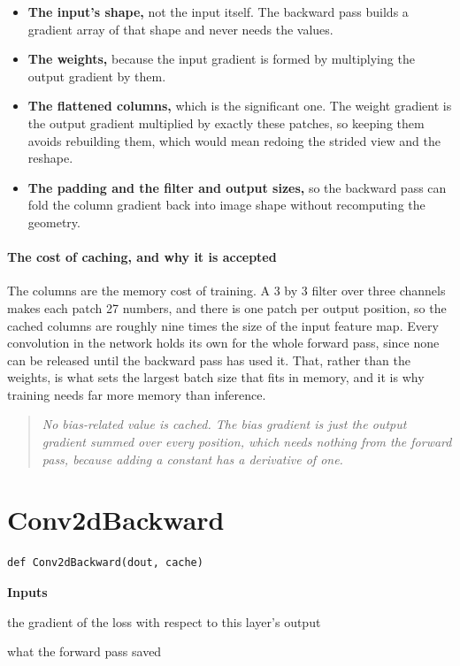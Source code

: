 \begin{itemize}\setlength\itemsep{0pt}
  \item \textbf{The input's shape,} not the input itself. The backward pass builds a gradient array of that shape and never needs the values.
  \item \textbf{The weights,} because the input gradient is formed by multiplying the output gradient by them.
  \item \textbf{The flattened columns,} which is the significant one. The weight gradient is the output gradient multiplied by exactly these patches, so keeping them avoids rebuilding them, which would mean redoing the strided view and the reshape.
  \item \textbf{The padding and the filter and output sizes,} so the backward pass can fold the column gradient back into image shape without recomputing the geometry.
\end{itemize}

\paragraph{The cost of caching, and why it is accepted}
The columns are the memory cost of training. A 3 by 3 filter over three channels makes each patch 27 numbers, and there is one patch per output position, so the cached columns are roughly nine times the size of the input feature map. Every convolution in the network holds its own for the whole forward pass, since none can be released until the backward pass has used it. That, rather than the weights, is what sets the largest batch size that fits in memory, and it is why training needs far more memory than inference.


\begin{quote}\small\itshape No bias-related value is cached. The bias gradient is just the output gradient summed over every position, which needs nothing from the forward pass, because adding a constant has a derivative of one.\end{quote}

\section{Conv2dBackward}
\begin{lstlisting}[style=sig]
def Conv2dBackward(dout, cache)
\end{lstlisting}

\noindent\textbf{Inputs}
\begin{description}[leftmargin=2.2em,style=nextline,font=\normalfont\ttfamily]\setlength\itemsep{1pt}
  \item[{dout}] \normalfont the gradient of the loss with respect to this layer's output
  \item[{cache}] \normalfont what the forward pass saved
\end{description}

